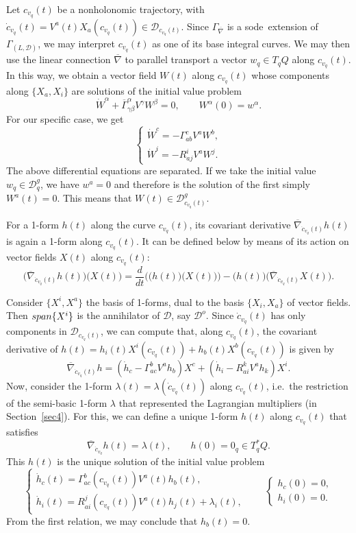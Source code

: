\documentclass[11pt]{article}
\def\sode{{\sc sode}}
\def\D{{\mathcal D}}
\def\GLD{{\Gamma_{(L,\mathcal{D})}}}
\begin{document}
Let $c_{v_q}(t)$ be a nonholonomic trajectory, with
${\dot c}_{v_q}(t) = V^a(t)X_a(c_{v_q}(t)) \in \D_{c_{v_q}(t)}$.
Since $\Gamma_{\overline\nabla}$ is a \sode\ extension of $\GLD$, we may  interpret $c_{v_q}(t)$ as one of its base integral curves. We may then use the linear connection ${\overline\nabla}$ to parallel transport a vector $w_q\in T_qQ$ along $c_{v_q}(t)$. In this way, we obtain a vector field $W(t)$ along $c_{v_q}(t)$ whose components along $\{X_a,X_i\}$ are solutions of the initial value problem  
$$
\dot{W}^\alpha +{\overline\Gamma}^\alpha_{\gamma\beta}V^\gamma W^\beta=0, \qquad W^\alpha(0) = w^\alpha.
$$
For our specific case, we get
\begin{equation*}
    \begin{cases}
       \dot{W}^c=-{\Gamma}_{ab}^cV^a W^b,\\
       \dot{W}^i=-R_{aj}^iV^a W^j.
    \end{cases}\nonumber
\end{equation*} 
The above differential equations are separated. If we take the initial value $w_q\in \D_q^g$, we have $w^a=0$ and therefore is the solution of the first simply $W^a(t)=0$. This means that $W(t) \in \D_{c_{v_q}(t)}^g$.



For a 1-form $h(t)$ along the curve $c_{v_q}(t)$, its covariant derivative ${\overline\nabla}_{{\dot c}_{v_q}(t)} h(t)$ is again a 1-form along $c_{v_q}(t)$. It can be defined below by means of its action on vector fields $X(t)$ along  $c_{v_q}(t)$:
\[
\Big(  {\overline\nabla}_{{\dot c}_{v_q}(t)} h(t) \Big) \Big(X(t)\Big) = \frac{d}{dt} \Big( \Big( h(t) \Big) \Big(X(t)\Big)\Big)  -   \Big( h(t) \Big) \Big( {\overline\nabla}_{{\dot c}_{v_q}(t)}  X(t) \Big).
\]

Consider $\{X^i, X^a\}$ the basis of 1-forms, dual to the basis $\{X_i, X_a\}$ of vector fields. Then ${\rm span}\{X^i\}$ is the annihilator of $\mathcal{D}$, say $\mathcal{D}^o$.
Since $\dot{c}_{v_q}(t)$ has only components in $\mathcal{D}_{c_{v_q}(t)}$, we can compute that, along $c_{v_q}(t)$, the covariant derivative of $h(t)=h_i(t)X^i(c_{v_q}(t))+h_b(t)X^b(c_{v_q}(t))$ is given by
\[
{\overline\nabla}_{\dot{c}_{v_q}(t)}h = \left(\dot{h}_c- {\Gamma}^b_{a c}V^a h_{b} \right)X^c + 
\left(\dot{h}_i- {R}^k_{a i}V^a  h_{k}\right)X^i.
\]
Now, consider the  1-form $\lambda(t) = \lambda({\dot c}_{v_q}(t))$ along  $c_{v_q}(t)$, i.e.\ the restriction of the semi-basic 1-form $\lambda$ that represented the Lagrangian multipliers (in Section~\ref{sec4}). For this, we can define a unique 1-form  $h(t)$ along $c_{v_q}(t)$ that satisfies 
   \[      {\overline\nabla}_{\dot{c}_{v_q}}h(t)=\lambda(t),\qquad h(0)=0_q\in T^*_qQ.
\]
This $h(t)$ is the unique solution of the initial value problem 
\[
    \begin{cases}
     \dot{h}_c(t)=\Gamma^b_{ac}(c_{v_q}(t))V^a(t) h_b(t),\\ \dot{h}_i(t)=R^j_{ai}(c_{v_q}(t))V^a(t) h_j(t)+\lambda_i(t),
		\end{cases}\qquad
		\begin{cases}
     h_c(0)= 0,\\
     h_i(0)=  0.
    \end{cases}
		\]
From the first relation, we may conclude that $h_b(t)=0$. 
\end{document}

